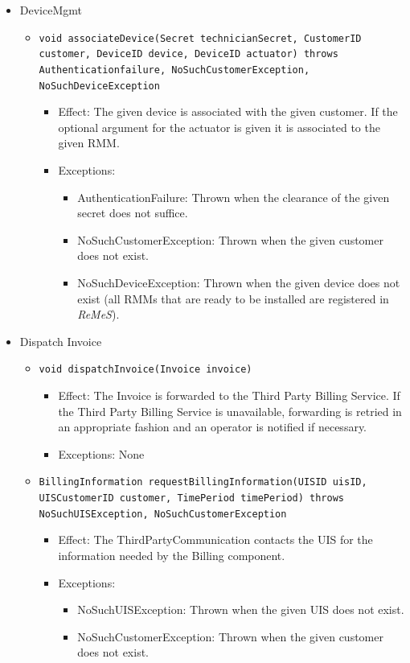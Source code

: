\documentclass[a4paper,10pt]{article}
\newcommand{\rem}{\emph{ReMeS}\xspace}
\begin{document}
\begin{itemize}
    \item DeviceMgmt
    \begin{itemize}
    	\item \texttt{void associateDevice(Secret technicianSecret, CustomerID customer, DeviceID device, DeviceID actuator) throws Authenticationfailure, NoSuchCustomerException, NoSuchDeviceException}
        \begin{itemize}
        	\item Effect: The given device is associated with the given customer. If the optional argument for the actuator is given it is associated to the given RMM.
            \item Exceptions:
            \begin{itemize}
            	\item AuthenticationFailure: Thrown when the clearance of the given secret does not suffice.
                \item NoSuchCustomerException: Thrown when the given customer does not exist.
                \item NoSuchDeviceException: Thrown when the given device does not exist (all RMMs that are ready to be installed are registered in \rem).
            \end{itemize}
        \end{itemize}
    \end{itemize}
    
    \item Dispatch Invoice
    \begin{itemize}
    	\item \texttt{void dispatchInvoice(Invoice invoice)}
        \begin{itemize}
            \item Effect: The Invoice is forwarded to the Third Party Billing Service. If the Third Party Billing Service is unavailable, forwarding is retried in an appropriate fashion and an operator is notified if necessary.
            \item Exceptions: None
        \end{itemize}
        \item \texttt{BillingInformation requestBillingInformation(UISID uisID, UISCustomerID customer, TimePeriod timePeriod) throws NoSuchUISException, NoSuchCustomerException}
        \begin{itemize}
        	\item Effect: The ThirdPartyCommunication contacts the UIS for the information needed by the Billing component.
        	\item Exceptions:
            \begin{itemize}
            	\item NoSuchUISException: Thrown when the given UIS does not exist.
            	\item NoSuchCustomerException: Thrown when the given customer does not exist.
            \end{itemize}
        \end{itemize}
    \end{itemize}
        

\end{itemize}
\end{document}
